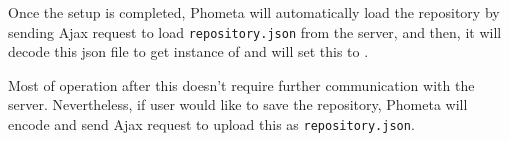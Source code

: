 \documentclass[master.tex]{subfiles}
\begin{document}
Once the setup is completed, Phometa will automatically load the repository by
sending Ajax request to load \texttt{repository.json} from the server, and then,
it will decode this json file to get instance of  and will set
this to .

Most of operation after this doesn't require further communication with the
server. Nevertheless, if user would like to save the repository, Phometa will
encode  and send Ajax request to upload this as
\texttt{repository.json}.
\end{document}
